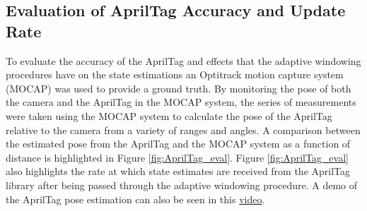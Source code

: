 \documentclass[11pt, twocolumn]{article}
\begin{document}
\subsection{Evaluation of AprilTag Accuracy and Update Rate}
To evaluate the accuracy of the AprilTag and effects that the adaptive windowing procedures have on the state estimations an Optitrack motion capture system (MOCAP) was used to provide a ground truth. By monitoring the pose of both the camera and the AprilTag in the MOCAP system, the series of measurements were taken using the MOCAP system to calculate the pose of the AprilTag relative to the camera from a variety of ranges and angles. A comparison between the estimated pose from the AprilTag and the MOCAP system as a function of distance is highlighted in Figure \ref{fig:AprilTag_eval}. Figure \ref{fig:AprilTag_eval} also highlights the rate at which state estimates are received from the AprilTag library after being passed through the adaptive windowing procedure. A demo of the AprilTag pose estimation can also be seen in this 
\href{https://www.youtube.com/watch?v=BBMlQphrqCY&index=19&list=PLk5z6lLnKFd6BD9EXWa09hqf6SNQhn59R}{video}.
\end{document}
